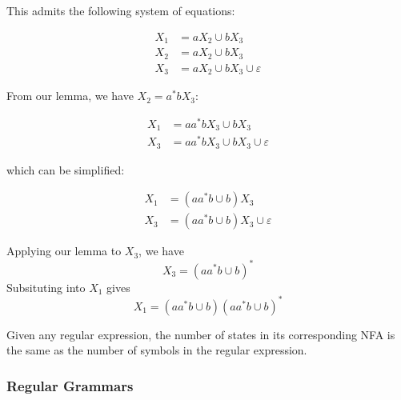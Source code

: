  This admits the following system of equations:

 \begin{align}
      X_1 &= aX_2\cup bX_3\\
      X_2 &= aX_2\cup bX_3\\
      X_3 &= aX_2\cup bX_3\cup\varepsilon
\end{align}

From our lemma, we have $X_2=a^*bX_3$:

\begin{align}
      X_1 &= aa^*bX_3\cup bX_3\\
      X_3 &= aa^*bX_3\cup bX_3\cup\varepsilon
\end{align}

which can be simplified:

\begin{align}
      X_1 &= (aa^*b\cup b)X_3\\
      X_3 &= (aa^*b\cup b)X_3\cup\varepsilon
\end{align}

Applying our lemma to $X_3$, we have \[X_3=(aa^*b\cup b)^*\] Subsituting into $X_1$ gives \[X_1=(aa^*b\cup b)(aa^*b\cup b)^*\] 

Given any regular expression, the number of states in its corresponding NFA is the same as the number of symbols in the regular expression. 
\subsubsection{Regular Grammars}

